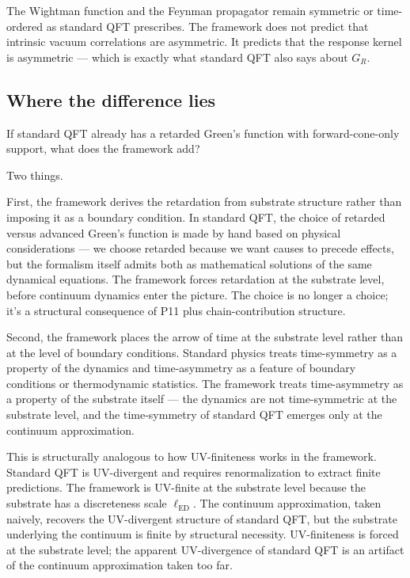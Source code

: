 \documentclass[11pt,a4paper]{article}
\begin{document}
The Wightman function and the Feynman propagator remain symmetric or time-ordered as standard QFT prescribes. The framework does not predict that intrinsic vacuum correlations are asymmetric. It predicts that the response kernel is asymmetric --- which is exactly what standard QFT also says about $G_R$.

\subsection{Where the difference lies}

If standard QFT already has a retarded Green's function with forward-cone-only support, what does the framework add?

Two things.

First, the framework derives the retardation from substrate structure rather than imposing it as a boundary condition. In standard QFT, the choice of retarded versus advanced Green's function is made by hand based on physical considerations --- we choose retarded because we want causes to precede effects, but the formalism itself admits both as mathematical solutions of the same dynamical equations. The framework forces retardation at the substrate level, before continuum dynamics enter the picture. The choice is no longer a choice; it's a structural consequence of P11 plus chain-contribution structure.

Second, the framework places the arrow of time at the substrate level rather than at the level of boundary conditions. Standard physics treats time-symmetry as a property of the dynamics and time-asymmetry as a feature of boundary conditions or thermodynamic statistics. The framework treats time-asymmetry as a property of the substrate itself --- the dynamics are not time-symmetric at the substrate level, and the time-symmetry of standard QFT emerges only at the continuum approximation.

This is structurally analogous to how UV-finiteness works in the framework. Standard QFT is UV-divergent and requires renormalization to extract finite predictions. The framework is UV-finite at the substrate level because the substrate has a discreteness scale $\ell_{\mathrm{ED}}$. The continuum approximation, taken naively, recovers the UV-divergent structure of standard QFT, but the substrate underlying the continuum is finite by structural necessity. UV-finiteness is forced at the substrate level; the apparent UV-divergence of standard QFT is an artifact of the continuum approximation taken too far.
\end{document}

